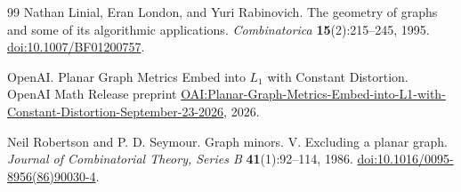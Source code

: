 \begin{thebibliography}{99}
Nathan Linial, Eran London, and Yuri Rabinovich.
The geometry of graphs and some of its algorithmic applications.
\emph{Combinatorica} \textbf{15}(2):215--245, 1995.
\href{https://doi.org/10.1007/BF01200757}{doi:10.1007/BF01200757}.

OpenAI.
Planar Graph Metrics Embed into $L_1$ with Constant Distortion.
OpenAI Math Release preprint
\href{https://github.com/openai/math/blob/main/preprints/Planar-Graph-Metrics-Embed-into-L1-with-Constant-Distortion-September-23-2026/paper.pdf}{OAI:Planar-Graph-Metrics-Embed-into-L1-with-Constant-Distortion-September-23-2026},
2026.

Neil Robertson and P. D. Seymour.
Graph minors. V. Excluding a planar graph.
\emph{Journal of Combinatorial Theory, Series B}
\textbf{41}(1):92--114, 1986.
\href{https://doi.org/10.1016/0095-8956(86)90030-4}
{doi:10.1016/0095-8956(86)90030-4}.

\end{thebibliography}
